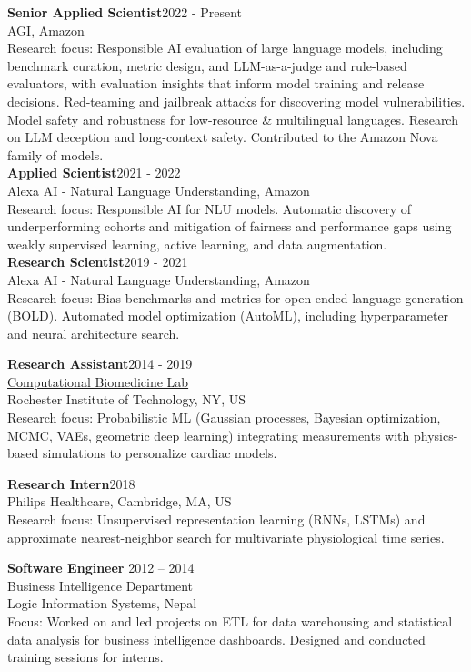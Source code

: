 \documentclass[margin]{res}
\begin{document}
\begin{resume}
\textbf{Senior Applied Scientist}\hfill 2022 - Present\\
{AGI, Amazon}\\
Research focus: Responsible AI evaluation of large language models, including benchmark curation, metric design, and LLM-as-a-judge and rule-based evaluators, with evaluation insights that inform model training and release decisions. Red-teaming and jailbreak attacks for discovering model vulnerabilities. Model safety and robustness for low-resource \& multilingual languages. Research on LLM deception and long-context safety. Contributed to the Amazon Nova family of models.\\
\textbf{Applied Scientist}\hfill 2021 - 2022\\
{Alexa AI - Natural Language Understanding, Amazon}\\
Research focus: Responsible AI for NLU models. Automatic discovery of underperforming cohorts and mitigation of fairness and performance gaps using weakly supervised learning, active learning, and data augmentation.\\
\textbf{Research Scientist}\hfill 2019 - 2021\\
{Alexa AI - Natural Language Understanding, Amazon}\\
Research focus: Bias benchmarks and metrics for open-ended language generation (BOLD). Automated model optimization (AutoML), including hyperparameter and neural architecture search.

\textbf{Research Assistant}\hfill 2014 - 2019\\
\href{https://people.rit.edu/lxwast/Linwei_Wangs_HomePage/CBL.html}{Computational Biomedicine Lab}\\
Rochester Institute of Technology, NY, US\\
Research focus: Probabilistic ML (Gaussian processes, Bayesian optimization, MCMC, VAEs, geometric deep learning) integrating measurements with physics-based simulations to personalize cardiac models.

\textbf{Research Intern}\hfill 2018\\
Philips Healthcare, Cambridge, MA, US\\
Research focus: Unsupervised representation learning (RNNs, LSTMs) and approximate nearest-neighbor search for multivariate physiological time series.

\textbf{Software Engineer} \hfill 2012 -- 2014\\
Business Intelligence Department\\ 
Logic Information Systems, Nepal\\
Focus: Worked on and led projects on ETL for data warehousing and statistical data analysis for business intelligence dashboards. Designed and conducted training sessions for interns. 


\end{resume}
\end{document}
